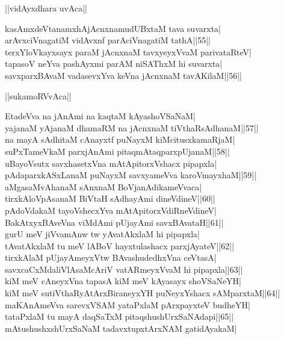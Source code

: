 \documentclass{article}
\begin{document}
\begin{center}
||vidAyxdhara uvAca||
\end{center}

kasAmxdeVtanamxhAjAcnxnamudUBxtaM tava suvarxta|\\
arAvxciVnagatiM vidAvxnf parAciVnagatiM tathA||55||\\
terxYloVkayxsayx paraM jAcnxnaM tavxyeyxVvaM parivataRteV|\\
tapasoV neYva pashAyxmi parAM niSAThxM hi suvarxta|\\
savxparxBAvaM vadasevxYva keVna jAcnxnaM tavAKilaM||56||\\

\begin{center}
||sukamoRVvAca||
\end{center}

EtadeVva na jAnAmi na kaqtaM kAyashoVSaNaM|\\
yajanaM yAjanaM dhamaRM na jAcnxnaM tiVthaRsAdhanaM||57||\\
na mayA sAdhitaM cAnayxtf puNayxM kiMcitusxkamaRjaM|\\
suPxTameVkaM parxjAnAmi pitaqmAtaqparxpUjanaM||58||\\
uBayoVsutx savxhasetxVna mAtApitorxVshacx pipapxla|\\
pAdaparxkASxLanaM puNayxM savxyameVva karoVmayxhaM||59||\\
aMgasaMvAhanaM sAnxnaM BoVjanAdikameVvaca|\\
tirxkAloVpAsanaM BiVtaH sAdhayAmi dineVdineV||60||\\
pAdoVdakaM tayoVshecxYva mAtApitorxVdiRneVdineV|\\
BakAtxyxBAveVna viMdAmi pUjayAmi savxBAvataH||61||\\
gurU meV jiVvamAnw tw yAvatAkxlaM hi pipapxla|\\
tAvatAkxlaM tu meV lABoV hayxtulashacx parxjAyateV||62||\\
tirxkAlaM pUjayAmeyxVtw BAvashudedhxVna ceVtasA|\\
savxcaCxMdaliVlAsaMcAriV vatARmeyxVvaM hi pipapxla||63||\\
kiM meV cAneyxVna tapasA kiM meV kAyasayx shoVSaNeYH|\\
kiM meV sutiVthaRyAtArxBiraneyxYH puNeyxYshacx sAMparxtaM||64||\\
maKAnAmeVva sarevxVSAM yataPxlaM pArxpayxteV budheYH|\\
tataPxlaM tu mayA daqSaTxM pitaqshushUrxSaNAdapi||65||\\
mAtushushxshUrxSaNaM tadavxtupxtArxNAM gatidAyakaM|\\
\end{document}
